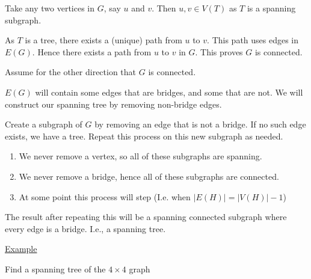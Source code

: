 \documentclass{article}
\begin{document}
Take any two vertices in $G$, say $u$ and $v$. Then $u,v \in V(T)$ as $T$ is a spanning subgraph. 

As $T$ is a tree, there exists a (unique) path from $u$ to $v$. This path uses edges in $E(G)$. Hence there exists a path from $u$ to $v$ in $G$. This proves $G$ is connected. 

Assume for the other direction that $G$ is connected. 

$E(G)$ will contain some edges that are bridges, and some that are not. We will construct our spanning tree by removing non-bridge edges. 

Create a subgraph of $G$ by removing an edge that is not a bridge. If no such edge exists, we have a tree. Repeat this process on this new subgraph as needed. 

\begin{enumerate}
    \item We never remove a vertex, so all of these subgraphs are spanning. 
    \item We never remove a bridge, hence all of these subgraphs are connected. 
    \item At some point this process will step (I.e. when $|E(H)| = |V(H)| -1$)
\end{enumerate}

The result after repeating this will be a spanning connected subgraph where every edge is a bridge. I.e., a spanning tree. 

\underline{Example}

Find a spanning tree of the $4 \times 4$ graph
\end{document}
